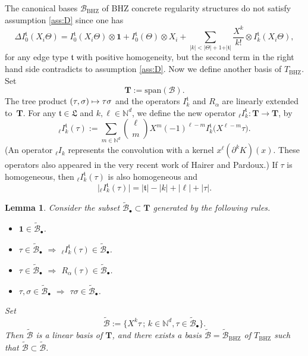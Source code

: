 \documentclass[11pt]{article}
\numberwithin{equation}{section}
\newcommand\mto{\mathchoice{\longmapsto}{\mapsto}{\mapsto}{\mapsto}}
\newcommand{\sbullet}{{\scriptscriptstyle\bullet}}
\theoremstyle{plain}
\newtheorem{lem}[thm]{Lemma}
\theoremstyle{definition}
\newcommand{\unit}{\mathbf{1}}
\newcommand{\BHZ}{{\scriptscriptstyle\mathrm{BHZ}}}
\newcommand{\bsT}{\boldsymbol{T}}
\newcommand{\bsmcB}{\boldsymbol{\mathcal{B}}}
\newcommand{\frkL}{\mathfrak{L}}
\newcommand{\frkt}{\mathfrak{t}}
\newcommand{\bbN}{\mathbb{N}}
\newcommand{\mcB}{\mathcal{B}}
\begin{document}
The canonical bases $\mcB_{\BHZ}$ of BHZ concrete regularity structures do not satisfy assumption \eqref{ass:D} since one has
\[
\Delta I^{\frkt}_0(X_i\Theta) = I^{\frkt}_0(X_i\Theta)\otimes\unit + I^{\frkt}_0(\Theta)\otimes X_i + \sum_{\vert k\vert< \vert\Theta\vert+1+\vert\frkt\vert}\frac{X^k}{k!}\otimes I^{\frkt}_k(X_i\Theta),
\]
for any edge type $\frkt$ with positive homogeneity, but the second term in the right hand side contradicts to assumption \eqref{ass:D}.
Now we define another basis of $T_{\BHZ}$. Set\vspace*{-3pt}
\[
\bsT := \textrm{span}(\bsmcB).
\]
The tree product $(\tau,\sigma)\mto\tau\sigma$ and the operators $I_k^\frkt$ and $R_\alpha$ are linearly extended to~$\bsT$. For any $\frkt\in\frkL$ and $k,\ell\in\bbN^d$, we define the new operator ${}_\ell I_k^\frkt:\bsT\to \bsT$, by\vspace*{-3pt}
\[
{}_\ell I_k^\frkt(\tau) := \sum_{m\in\bbN^d}\binom{\ell}{m}X^m(-1)^{\ell-m}I_k^\frkt\bigl(X^{\ell-m}\tau\bigr).
\]
(An operator ${}_\ell I_k$ represents the convolution with a kernel $x^\ell(\partial^k K)(x)$. These oper\-ators also appeared in the very recent work \cite{HP19} of Hairer and Pardoux.) If $\tau$ is homogeneous, then ${}_\ell I_k^\frkt(\tau)$ is also homogeneous and\vspace*{-3pt}
\[
\big|{}_\ell I_k^\frkt(\tau)\big| = |\frkt| - |k| + |\ell | + |\tau|.
\]

\begin{lem}
Consider the subset $\widetilde{\bsmcB}_\sbullet\subset \bsT$ generated by the following rules.
\begin{itemize}
\item $\unit\in\widetilde{\bsmcB}_\sbullet$.
\item $\tau\in\widetilde{\bsmcB}_\sbullet$ $\Rightarrow$ ${}_\ell I_k^\frkt(\tau)\in\widetilde{\bsmcB}_\sbullet$.
\item $\tau\in\widetilde{\bsmcB}_\sbullet$ $\Rightarrow$ $R_\alpha(\tau)\in\widetilde{\bsmcB}_\sbullet$.
\item $\tau,\sigma\in\widetilde{\bsmcB}_\sbullet$ $\Rightarrow$ $\tau\sigma\in\widetilde{\bsmcB}_\sbullet$.
\end{itemize}
Set\vspace*{-3pt}
\[
\widetilde{\bsmcB} := \big\{X^k\tau\,;\, k\in\bbN^d, \tau\in\widetilde{\bsmcB}_\sbullet\big\}.
\]
Then $\widetilde{\bsmcB}$ is a linear basis of $\bsT$, and there exists a basis $\widetilde{\mcB}=\widetilde{\mcB}_{\BHZ}$ of $T_{\BHZ}$ such that $\widetilde{\mcB}\subset\widetilde{\bsmcB}$.
\end{lem}
\end{document}
